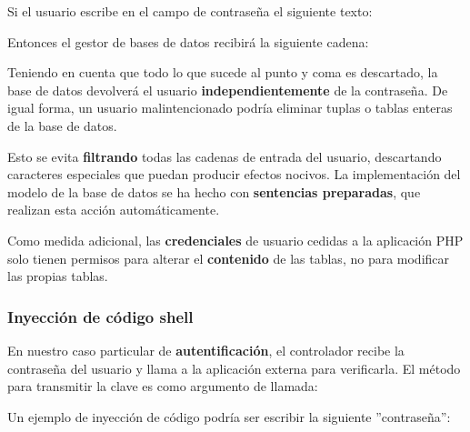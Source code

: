 \begin{center}
\end{center}

Si el usuario escribe en el campo de contraseña el siguiente texto:

\begin{center}
\end{center}

Entonces el gestor de bases de datos recibirá la siguiente cadena:

\begin{center}
\end{center}

Teniendo en cuenta que todo lo que sucede al punto y coma es descartado, la base de datos devolverá el usuario \textbf{independientemente} de la contraseña. De igual forma, un usuario malintencionado podría eliminar tuplas o tablas enteras de la base de datos.

Esto se evita \textbf{filtrando} todas las cadenas de entrada del usuario, descartando caracteres especiales que puedan producir efectos nocivos. La implementación del modelo de la base de datos se ha hecho con \textbf{sentencias preparadas}, que realizan esta acción automáticamente.

Como medida adicional, las \textbf{credenciales} de usuario cedidas a la aplicación \acrshort{PHP} solo tienen permisos para alterar el \textbf{contenido} de las tablas, no para modificar las propias tablas.

\subsubsection{Inyección de código shell}

En nuestro caso particular de \textbf{autentificación}, el controlador recibe la contraseña del usuario y llama a la aplicación externa para verificarla. El método para transmitir la clave es como argumento de llamada:

\begin{center}
\end{center}

Un ejemplo de inyección de código podría ser escribir la siguiente ''contraseña'':

\begin{center}
\end{center}

